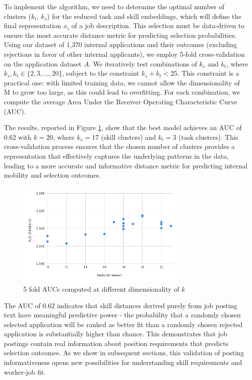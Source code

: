 \documentclass[12pt]{article}
\begin{document}
To implement the algorithm, we need to determine the optimal number of clusters ($k_t$, $k_s$) for the reduced task and skill embeddings, which will define the final representation $x_i$ of a job description. This selection must be data-driven to ensure the most accurate distance metric for predicting selection probabilities. Using our dataset of 1,370 internal applications and their outcomes (excluding rejections in favor of other internal applicants), we employ 5-fold cross-validation on the application dataset $A$. We iteratively test combinations of $k_s$ and $k_t$, where $k_s, k_t \in \{2, 3, ..., 20\}$, subject to the constraint $k_s + k_t < 25$. This constraint is a practical one: with limited training data, we cannot allow the dimensionality of M to grow too large, as this could lead to overfitting. For each combination, we compute the average Area Under the Receiver Operating Characteristic Curve (AUC).

The results, reported in Figure \ref{fig:AUC}, show that the best model achieves an AUC of 0.62 with $k = 20$, where $k_s = 17$ (skill clusters) and $k_t = 3$ (task clusters). This cross-validation process ensures that the chosen number of clusters provides a representation that effectively captures the underlying patterns in the data, leading to a more accurate and informative distance metric for predicting internal mobility and selection outcomes.  

\begin{figure}[htb]
    \centering
    \includegraphics[width=0.75\textwidth]{new_img/chart.png}
    \caption{5 fold AUCs computed at different dimensionality of $k$}
    \label{fig:AUC}
\end{figure}


The AUC of 0.62 indicates that skill distances derived purely from job posting text have meaningful predictive power - the probability that a randomly chosen selected application will be ranked as better fit than a randomly chosen rejected application is substantially higher than chance. This demonstrates that job postings contain real information about position requirements that predicts selection outcomes. As we show in subsequent sections, this validation of posting informativeness opens new possibilities for understanding skill requirements and worker-job fit.
\end{document}
